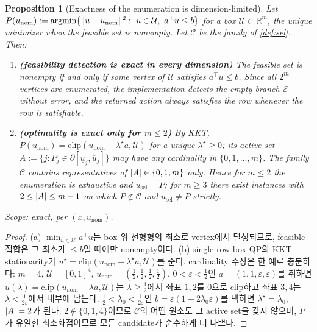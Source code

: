 \documentclass[11pt]{article}
\theoremstyle{plain}
\newtheorem{proposition}[theorem]{Proposition}
\theoremstyle{definition}
\theoremstyle{remark}
\newcommand{\R}{\mathbb{R}}
\DeclarePairedDelimiter{\norm}{\lVert}{\rVert}
\DeclarePairedDelimiter{\abs}{\lvert}{\rvert}
\newcommand{\calU}{\mathcal{U}}
\newcommand{\eqdef}{:=}
\begin{document}
\begin{proposition}[Exactness of the enumeration is dimension-limited]\label{prop:enum-exact}
Let $P(u_{\mathrm{nom}})\eqdef\operatorname{argmin}\{\norm{u-u_{\mathrm{nom}}}^2:\ u\in\calU,\
a^\top u\le b\}$ for a box $\calU\subset\R^m$, the unique minimizer when the feasible set is
nonempty. Let $\mathcal C$ be the family of \cref{def:sel}. Then:
\begin{enumerate}[label=(\alph*)]
  \item \textbf{(feasibility detection is exact in every dimension)} The feasible set is nonempty
  if and only if some vertex of $\calU$ satisfies $a^\top u\le b$. Since all $2^m$ vertices are
  enumerated, the implementation detects the empty branch $\mathcal E$ without error, and the
  returned action always satisfies the row whenever the row is satisfiable.
  \item \textbf{(optimality is exact only for $m\le2$)} By KKT,
  $P(u_{\mathrm{nom}})=\mathrm{clip}(u_{\mathrm{nom}}-\lambda^\star a,\calU)$ for a unique
  $\lambda^\star\ge0$; its active set
  $A\eqdef\{j: P_j\in\partial[\underline u_j,\overline u_j]\}$ may have any cardinality in
  $\{0,1,\dots,m\}$. The family $\mathcal C$ contains representatives of $\abs A\in\{0,1,m\}$
  only. Hence for $m\le2$ the enumeration is exhaustive and $u_{\mathrm{sel}}=P$; for $m\ge3$
  there exist instances with $2\le\abs A\le m-1$ on which $P\notin\mathcal C$ and
  $u_{\mathrm{sel}}\neq P$ strictly.
\end{enumerate}
Scope: exact, per $(x,u_{\mathrm{nom}})$.
\end{proposition}
\begin{proof}
(a) $\min_{u\in\calU}a^\top u$는 box 위 선형형의 최소로 vertex에서 달성되므로, feasible 집합은 그
최소가 $\le b$일 때에만 nonempty이다. (b) single-row box QP의 KKT stationarity가
$u^\star=\mathrm{clip}(u_{\mathrm{nom}}-\lambda^\star a,\calU)$를 준다. cardinality 주장은 한 예로
충분하다: $m=4$, $\calU=[0,1]^4$, $u_{\mathrm{nom}}=(\tfrac12,\tfrac12,\tfrac12,\tfrac12)$,
$0<\varepsilon<\tfrac12$인 $a=(1,1,\varepsilon,\varepsilon)$를 취하면
$u(\lambda)=\mathrm{clip}(u_{\mathrm{nom}}-\lambda a,\calU)$는 $\lambda\ge\tfrac12$에서 좌표
$1,2$를 $0$으로 clip하고 좌표 $3,4$는 $\lambda<\tfrac1{2\varepsilon}$에서 내부에 남는다.
$\tfrac12<\lambda_0<\tfrac1{2\varepsilon}$인 $b=\varepsilon(1-2\lambda_0\varepsilon)$를 택하면
$\lambda^\star=\lambda_0$, $\abs A=2$가 된다. $2\notin\{0,1,4\}$이므로 $\mathcal C$의 어떤 원소도 그
active set을 갖지 않으며, $P$가 유일한 최소화점이므로 모든 candidate가 순수하게 더 나쁘다.
\end{proof}
\end{document}
